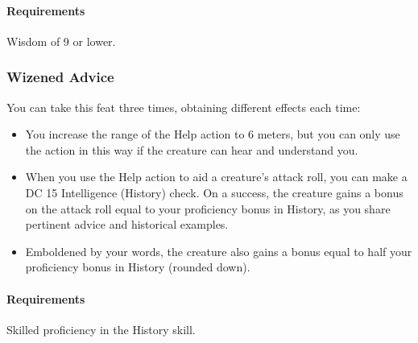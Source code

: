     \paragraph{Requirements} Wisdom of 9 or lower.
%
%
%
\subsubsection{Wizened Advice} \label{feat::wizenedadvice}
    You can take this feat three times, obtaining different effects each time:
    \begin{itemize}
        \item You increase the range of the Help action to 6 meters, but you can only use the action in this way if the creature can hear and understand you.
        \item When you use the Help action to aid a creature's attack roll, you can make a DC 15 Intelligence (History) check.
        On a success, the creature gains a bonus on the attack roll equal to your proficiency bonus in History, as you share pertinent advice and historical examples.
        \item Emboldened by your words, the creature also gains a bonus equal to half your proficiency bonus in History (rounded down).
    \end{itemize}
    \paragraph{Requirements} Skilled proficiency in the History skill.
